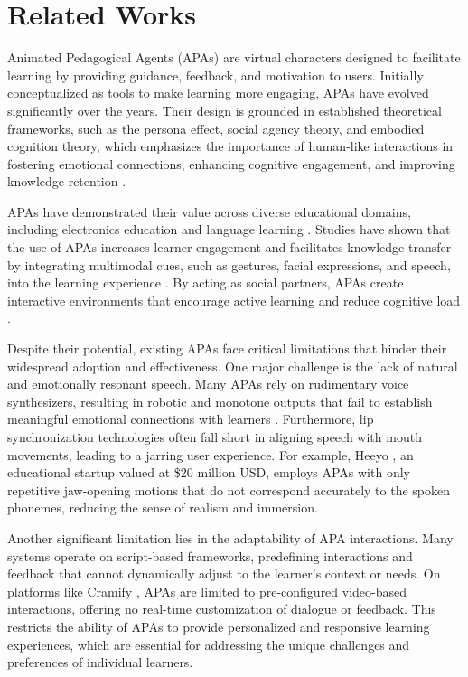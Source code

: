 \section{Related Works}
Animated Pedagogical Agents (APAs) are virtual characters designed to facilitate learning by providing guidance, feedback, and motivation to users. Initially conceptualized as tools to make learning more engaging, APAs have evolved significantly over the years. Their design is grounded in established theoretical frameworks, such as the persona effect, social agency theory, and embodied cognition theory, which emphasizes the importance of human-like interactions in fostering emotional connections, enhancing cognitive engagement, and improving knowledge retention \cite{Lester1997, Veletsianos2012, WangMultimedia}.

APAs have demonstrated their value across diverse educational domains, including electronics education \cite{Graesser2018} and language learning \cite{Roscoe2013}. Studies have shown that the use of APAs increases learner engagement and facilitates knowledge transfer by integrating multimodal cues, such as gestures, facial expressions, and speech, into the learning experience \cite{Makransky2018, Domagk2010}. By acting as social partners, APAs create interactive environments that encourage active learning and reduce cognitive load \cite{Mayer2014, Li2019}.

Despite their potential, existing APAs face critical limitations that hinder their widespread adoption and effectiveness. One major challenge is the lack of natural and emotionally resonant speech. Many APAs rely on rudimentary voice synthesizers, resulting in robotic and monotone outputs that fail to establish meaningful emotional connections with learners \cite{Dai2022}. Furthermore, lip synchronization technologies often fall short in aligning speech with mouth movements, leading to a jarring user experience. For example, Heeyo \cite{heeyoHeeyo}, an educational startup valued at \$20 million USD, employs APAs with only repetitive jaw-opening motions that do not correspond accurately to the spoken phonemes, reducing the sense of realism and immersion.

Another significant limitation lies in the adaptability of APA interactions. Many systems operate on script-based frameworks, predefining interactions and feedback that cannot dynamically adjust to the learner’s context or needs. On platforms like Cramify \cite{cramifyCramifyCram}, APAs are limited to pre-configured video-based interactions, offering no real-time customization of dialogue or feedback. This restricts the ability of APAs to provide personalized and responsive learning experiences, which are essential for addressing the unique challenges and preferences of individual learners.

